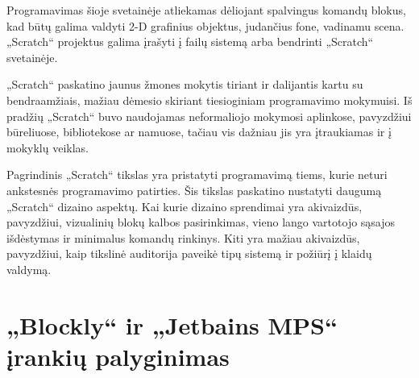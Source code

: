 \documentclass{VUMIFPSkursinis}
\begin{document}
Programavimas šioje svetainėje atliekamas dėliojant spalvingus komandų blokus, kad būtų galima valdyti 2-D grafinius objektus, judančius fone, vadinamu scena. „Scratch“ projektus galima įrašyti į failų sistemą arba bendrinti „Scratch“ svetainėje.

„Scratch“ paskatino jaunus žmones mokytis tiriant ir dalijantis kartu su bendraamžiais, mažiau dėmesio skiriant tiesioginiam programavimo mokymuisi. Iš pradžių „Scratch“ buvo naudojamas neformaliojo mokymosi aplinkose, pavyzdžiui būreliuose, bibliotekose ar namuose, tačiau vis dažniau jis yra įtraukiamas ir į mokyklų veiklas.

Pagrindinis „Scratch“ tikslas yra pristatyti programavimą tiems, kurie neturi ankstesnės programavimo patirties. Šis tikslas paskatino nustatyti daugumą „Scratch“ dizaino aspektų. Kai kurie dizaino sprendimai yra akivaizdūs, pavyzdžiui, vizualinių blokų kalbos pasirinkimas, vieno lango vartotojo sąsajos išdėstymas ir minimalus komandų rinkinys. Kiti yra mažiau akivaizdūs, pavyzdžiui, kaip tikslinė auditorija paveikė tipų sistemą ir požiūrį į klaidų valdymą. \cite{maloney2010scratch}

\section{„Blockly“ ir „Jetbains MPS“ įrankių palyginimas}
\end{document}
